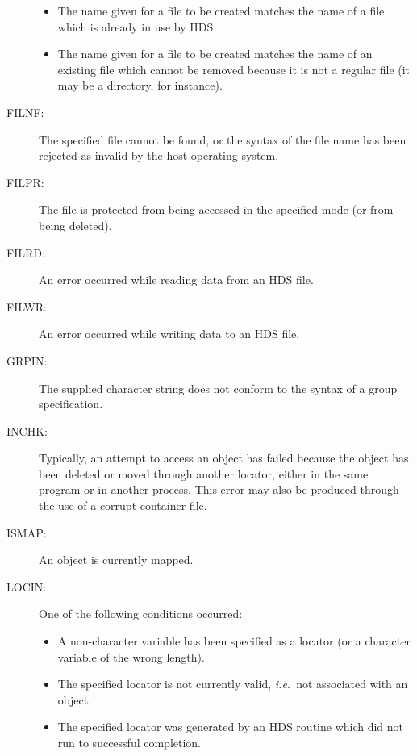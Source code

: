 \documentclass[11pt]{article}
\newcommand{\htmlref}[2]{#1}
\newcommand{\st}[1]{{\em{#1}}}
\begin{document}
\begin{description}
\begin{itemize}
\item The name given for a file to be created matches the name of a file which
is already in use by HDS.

\item The name given for a file to be created matches the name of an existing
file which cannot be removed because it is not a regular file (it may be a
directory, for instance).

\end{itemize}

\item [FILNF:]
The specified file cannot be found, or the syntax of the file name has been
rejected as invalid by the host operating system.

\item [FILPR:]
The file is protected from being accessed in the specified mode (or from being
deleted).

\item [FILRD:]
An error occurred while reading data from an HDS file.

\item [FILWR:]
An error occurred while writing data to an HDS file.

\item [GRPIN:]
The supplied character string does not conform to the syntax of a \htmlref{group}{sect:group}
specification.

\item [INCHK:]
Typically, an attempt to access an object has failed because the object has
been deleted or moved through another \htmlref{locator}{sect:locators}, either in the same program or in
another process. This error may also be produced through the use of a corrupt
container file.

\item [ISMAP:]
An object is currently mapped.

\item [LOCIN:]
One of the following conditions occurred:

\begin{itemize}
\item A non-character variable has been specified as a \htmlref{locator}{sect:locators} (or a character
variable of the wrong length).

\item The specified \htmlref{locator}{sect:locators} is not currently valid, \st{i.e.}\ not associated
with an object.

\item The specified \htmlref{locator}{sect:locators} was generated by an HDS routine which did not run
to successful completion.


\end{itemize}
\end{description}
\end{document}
